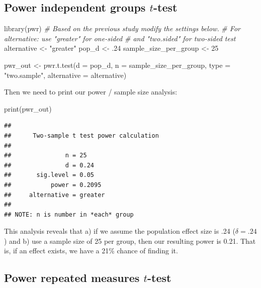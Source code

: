 \documentclass[
]{krantz}
\makeatletter
\newenvironment{Shaded}{\begin{snugshade}}{\end{snugshade}}
\newcommand{\AttributeTok}[1]{\textcolor[rgb]{0.61,0.61,0.61}{#1}}
\newcommand{\CommentTok}[1]{\textcolor[rgb]{0.37,0.37,0.37}{\textit{#1}}}
\newcommand{\DecValTok}[1]{\textcolor[rgb]{0.06,0.06,0.06}{#1}}
\newcommand{\FunctionTok}[1]{\textcolor[rgb]{0,0,0}{#1}}
\newcommand{\NormalTok}[1]{#1}
\newcommand{\OtherTok}[1]{\textcolor[rgb]{0.37,0.37,0.37}{#1}}
\newcommand{\StringTok}[1]{\textcolor[rgb]{0.5,0.5,0.5}{#1}}
\newenvironment{kframe}{%
\medskip{}
\setlength{\fboxsep}{.8em}
 \def\at@end@of@kframe{}%
 \ifinner\ifhmode%
  \def\at@end@of@kframe{\end{minipage}}%
  \begin{minipage}{\columnwidth}%
 \fi\fi%
 \def\FrameCommand##1{\hskip\@totalleftmargin \hskip-\fboxsep
 \colorbox{shadecolor}{##1}\hskip-\fboxsep
     \hskip-\linewidth \hskip-\@totalleftmargin \hskip\columnwidth}%
 \MakeFramed {\advance\hsize-\width
   \@totalleftmargin\z@ \linewidth\hsize
   \@setminipage}}%
 {\par\unskip\endMakeFramed%
 \at@end@of@kframe}
\renewenvironment{Shaded}{\begin{kframe}}{\end{kframe}}
\makeatother
\begin{document}
\hypertarget{power-independent-groups-t-test}{%
\subsection{\texorpdfstring{Power independent groups \(t\)-test}{Power independent groups t-test}}\label{power-independent-groups-t-test}}

\begin{Shaded}
\begin{Highlighting}[]
\FunctionTok{library}\NormalTok{(pwr)}
\CommentTok{\# Based on the previous study modify the settings below.}
\CommentTok{\# For alternative: use "greater" for one{-}sided }
\CommentTok{\# and "two.sided" for two{-}sided test}
\NormalTok{alternative }\OtherTok{\textless{}{-}} \StringTok{"greater"}
\NormalTok{pop\_d }\OtherTok{\textless{}{-}}\NormalTok{ .}\DecValTok{24}
\NormalTok{sample\_size\_per\_group }\OtherTok{\textless{}{-}} \DecValTok{25}

\NormalTok{pwr\_out }\OtherTok{\textless{}{-}} \FunctionTok{pwr.t.test}\NormalTok{(}\AttributeTok{d =}\NormalTok{ pop\_d, }
                      \AttributeTok{n =}\NormalTok{ sample\_size\_per\_group,}
                      \AttributeTok{type =} \StringTok{"two.sample"}\NormalTok{,}
                      \AttributeTok{alternative =}\NormalTok{ alternative)}
\end{Highlighting}
\end{Shaded}

Then we need to print our power / sample size analysis:

\begin{Shaded}
\begin{Highlighting}[]
\FunctionTok{print}\NormalTok{(pwr\_out)}
\end{Highlighting}
\end{Shaded}

\begin{verbatim}
## 
##      Two-sample t test power calculation 
## 
##               n = 25
##               d = 0.24
##       sig.level = 0.05
##           power = 0.2095
##     alternative = greater
## 
## NOTE: n is number in *each* group
\end{verbatim}

This analysis reveals that a) if we assume the population effect size is .24 (\(\delta = .24\)) and b) use a sample size of 25 per group, then our resulting power is 0.21. That is, if an effect exists, we have a 21\% chance of finding it.

\hypertarget{power-repeated-measures-t-test}{%
\subsection{\texorpdfstring{Power repeated measures \(t\)-test}{Power repeated measures t-test}}\label{power-repeated-measures-t-test}}
\end{document}
